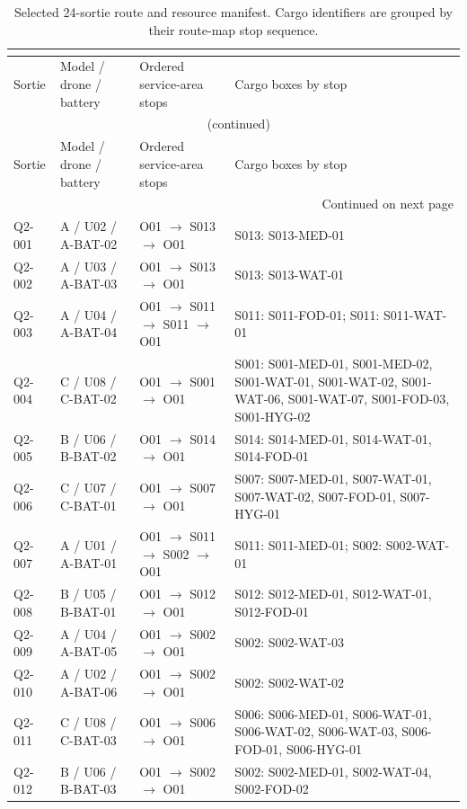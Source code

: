 \documentclass[11pt,a4paper]{article}
\begin{document}
{\footnotesize
\begin{longtable}{@{}p{1.2cm}p{2.5cm}p{3.3cm}p{8.0cm}@{}}
\caption{Selected 24-sortie route and resource manifest. Cargo identifiers are grouped by their route-map stop sequence.}\\
\label{tab:q2-manifest}\\
\toprule
Sortie & Model / drone / battery & Ordered service-area stops & Cargo boxes by stop\\
\midrule
\endfirsthead
\multicolumn{4}{c}{\tablename\ \thetable{} (continued)}\\
\toprule
Sortie & Model / drone / battery & Ordered service-area stops & Cargo boxes by stop\\
\midrule
\endhead
\midrule\multicolumn{4}{r}{Continued on next page}\\
\endfoot
\bottomrule
\endlastfoot
Q2-001 & A / U02 / A-BAT-02 & O01 $\to$ S013 $\to$ O01 & S013: S013-MED-01\\
Q2-002 & A / U03 / A-BAT-03 & O01 $\to$ S013 $\to$ O01 & S013: S013-WAT-01\\
Q2-003 & A / U04 / A-BAT-04 & O01 $\to$ S011 $\to$ S011 $\to$ O01 & S011: S011-FOD-01; S011: S011-WAT-01\\
Q2-004 & C / U08 / C-BAT-02 & O01 $\to$ S001 $\to$ O01 & S001: S001-MED-01, S001-MED-02, S001-WAT-01, S001-WAT-02, S001-WAT-06, S001-WAT-07, S001-FOD-03, S001-HYG-02\\
Q2-005 & B / U06 / B-BAT-02 & O01 $\to$ S014 $\to$ O01 & S014: S014-MED-01, S014-WAT-01, S014-FOD-01\\
Q2-006 & C / U07 / C-BAT-01 & O01 $\to$ S007 $\to$ O01 & S007: S007-MED-01, S007-WAT-01, S007-WAT-02, S007-FOD-01, S007-HYG-01\\
Q2-007 & A / U01 / A-BAT-01 & O01 $\to$ S011 $\to$ S002 $\to$ O01 & S011: S011-MED-01; S002: S002-WAT-01\\
Q2-008 & B / U05 / B-BAT-01 & O01 $\to$ S012 $\to$ O01 & S012: S012-MED-01, S012-WAT-01, S012-FOD-01\\
Q2-009 & A / U04 / A-BAT-05 & O01 $\to$ S002 $\to$ O01 & S002: S002-WAT-03\\
Q2-010 & A / U02 / A-BAT-06 & O01 $\to$ S002 $\to$ O01 & S002: S002-WAT-02\\
Q2-011 & C / U08 / C-BAT-03 & O01 $\to$ S006 $\to$ O01 & S006: S006-MED-01, S006-WAT-01, S006-WAT-02, S006-WAT-03, S006-FOD-01, S006-HYG-01\\
Q2-012 & B / U06 / B-BAT-03 & O01 $\to$ S002 $\to$ O01 & S002: S002-MED-01, S002-WAT-04, S002-FOD-02\\

\end{longtable}}
\end{document}
